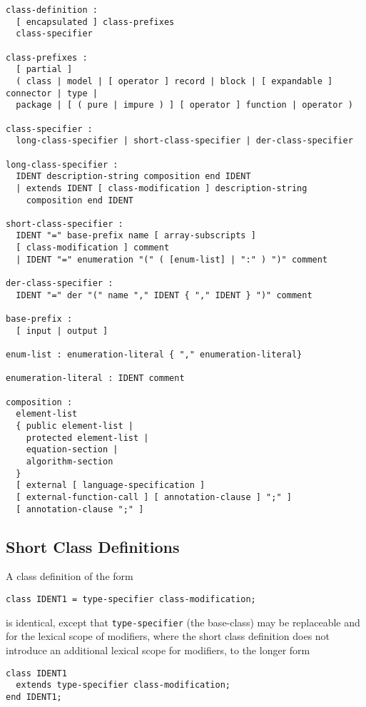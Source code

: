 \begin{lstlisting}[language=grammar]
class-definition :
  [ encapsulated ] class-prefixes
  class-specifier

class-prefixes :
  [ partial ]
  ( class | model | [ operator ] record | block | [ expandable ] connector | type |
  package | [ ( pure | impure ) ] [ operator ] function | operator )

class-specifier :
  long-class-specifier | short-class-specifier | der-class-specifier

long-class-specifier :
  IDENT description-string composition end IDENT
  | extends IDENT [ class-modification ] description-string
    composition end IDENT

short-class-specifier :
  IDENT "=" base-prefix name [ array-subscripts ]
  [ class-modification ] comment
  | IDENT "=" enumeration "(" ( [enum-list] | ":" ) ")" comment

der-class-specifier :
  IDENT "=" der "(" name "," IDENT { "," IDENT } ")" comment

base-prefix :
  [ input | output ]

enum-list : enumeration-literal { "," enumeration-literal}

enumeration-literal : IDENT comment

composition :
  element-list
  { public element-list |
    protected element-list |
    equation-section |
    algorithm-section
  }
  [ external [ language-specification ]
  [ external-function-call ] [ annotation-clause ] ";" ]
  [ annotation-clause ";" ]
\end{lstlisting}

\subsection{Short Class Definitions}\label{short-class-definitions}

A class definition of the form
\begin{lstlisting}[language=modelica]
class IDENT1 = type-specifier class-modification;
\end{lstlisting}
is identical, except that \lstinline!type-specifier! (the base-class) may be replaceable and for the lexical
scope of modifiers, where the short class definition does not introduce
an additional lexical scope for modifiers, to the longer form
\begin{lstlisting}[language=modelica]
class IDENT1
  extends type-specifier class-modification;
end IDENT1;
\end{lstlisting}

